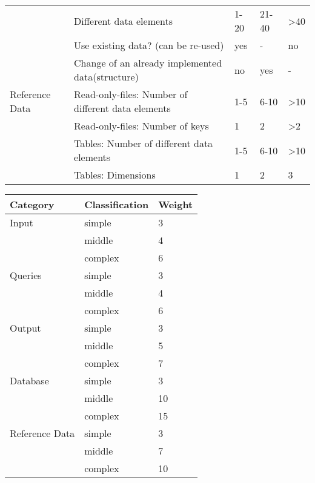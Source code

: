 \documentclass[a4paper]{article}
\begin{document}
\begin{multicols}{3}
\begin{tabular}{l|l|l|l|l}
                   & Different data elements                                                                                           & 1-20   & 21-40              & >40 \\
                   & Use existing data? (can be re-used)                                                                               & yes    & -                  & no \\
                   & Change of an already implemented data(structure)                                                                  & no     & yes                & -                              \\
    Reference Data & Read-only-files: Number of different data elements                                                                & 1-5    & 6-10               & >10                            \\
                   & Read-only-files: Number of keys                                                                                   & 1      & 2                  & >2                             \\
                   & Tables: Number of different data elements                                                                         & 1-5    & 6-10               & >10                            \\
                   & Tables: Dimensions                                                                                                & 1      & 2                  & 3                              
  \end{tabular}
  
  \begin{tabular}{l|l|l}
  Category       & Classification & Weight \\\hline
  Input          & simple         & 3      \\
                 & middle         & 4      \\
                 & complex        & 6      \\
  Queries        & simple         & 3      \\
                  & middle         & 4      \\
                  & complex        & 6      \\
   Output         & simple         & 3      \\
                  & middle         & 5      \\
                  & complex        & 7      \\
   Database       & simple         & 3      \\
                  & middle         & 10     \\
                  & complex        & 15     \\
   Reference Data & simple         & 3      \\
                  & middle         & 7      \\
                  & complex        & 10     
  \end{tabular}
  

\end{multicols}
\end{document}
